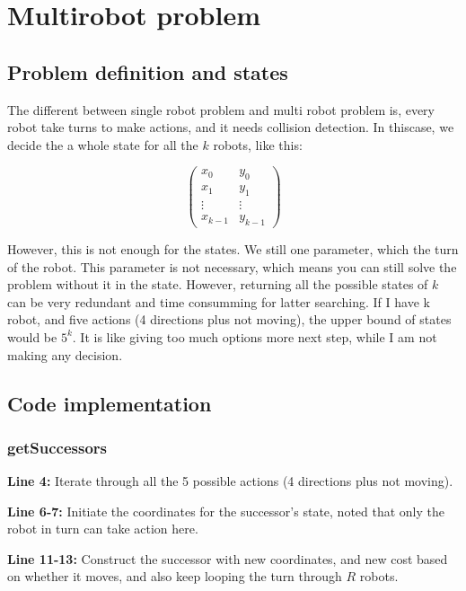 \clearpage
\section{Multirobot problem}
\subsection{Problem definition and states}

The different between single robot problem and multi robot problem is, every robot take turns to make actions, and it needs collision detection. In thiscase, we decide the a whole state for all the $k$ robots, like this:



$$\begin{pmatrix}
  x_0 & y_0 \\
  x_1 & y_1 \\
  \vdots & \vdots \\	
  x_{k-1} & y_{k-1}
 \end{pmatrix}$$
 
 However, this is not enough for the states. We still one parameter, which the turn of the robot. This parameter is not necessary, which means you can still solve the problem without it in the state. However, returning all the possible states of $k$ can be very redundant and time consumming for latter searching. If I have k robot, and five actions (4 directions plus not moving), the upper bound of states would be $5^k$. It is like giving too much options more next step, while I am not making any decision. 


\subsection{Code implementation}




\subsubsection{getSuccessors}

\textbf{Line 4:} Iterate through all the 5 possible actions (4 directions plus not moving).


\textbf{Line 6-7:} Initiate the coordinates for the successor's state, noted that only the robot in turn can take action here.


\textbf{Line 11-13:} Construct the successor with new coordinates, and new cost based on whether it moves, and also keep looping the turn through $R$ robots.


